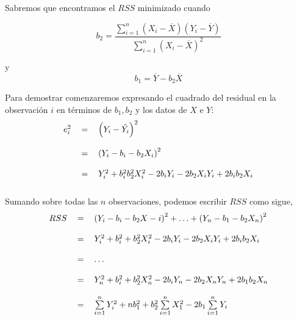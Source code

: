 \begin{multicols}{2}
Sabremos que encontramos el $RSS$ minimizado cuando 
\begin{tcolorbox}[colframe = white]
    \begin{equation}
	b_2 = \dfrac{\sum\limits_{i=1}^n \left(X_i-\overline{X}\right)\left(Y_i - \overline{Y}\right)}{\sum\limits_{i=1}^n \left(X_i - \overline{X}\right)^2}
    \end{equation}
\end{tcolorbox}

y
\begin{equation}
    b_1 = \overline{Y} - b_2 \overline{X}
\end{equation}

Para demostrar comenzaremos expresando el cuadrado del residual en la observación $i$ en términos de $b_1, b_2$ y los datos de $X$ e $Y$:
\begin{equation}
    \begin{tabular}{rcl}
	$e_i^2$ &=& $\left(Y_i - \hat{Y_i}\right)^2$\\\\ 
	      &=& $\left(Y_i - b_i - b_2 X_i\right)^2$ \\\\
	      &=& $Y_i^2 + b_i^2 b_2^2X_i^2 - 2b_iY_i - 2b_2X_iY_i + 2b_i b_2X_i$\\\\
    \end{tabular}
\end{equation}
Sumando sobre todas las $n$ observaciones, podemos escribir $RSS$ como sigue,\\
\begin{equation}
    \begin{tabular}{rcl}
	$RSS$&=&$\left(Y_i - b_i -b_2X-i\right)^2 + \ldots + \left(Y_n - b_1 - b_2X_n\right)^2$\\\\
	     &=&$Y_i^2 + b_i^2 + b_2^2X_i^2 - 2b_iY_i -2b_2X_iY_i + 2b_ib_2X_i$\\\\
	     &=&$\ldots$\\\\
	     &=&$Y_n^2 + b_i^2 + b_2^2X_n^2 - 2b_iY_n - 2b_2X_nY_n + 2b_1b_2 X_n$\\\\
	     &=&$\sum\limits_{i=1}^n Y_i^2 + nb_1^2 + b_2^2\sum\limits_{i=1}^n X_1^2 - 2b_1\sum\limits_{i=1}^n Y_i $\\\\

\end{tabular}
\end{equation}
\end{multicols}
